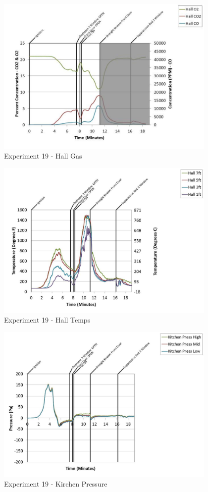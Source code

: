 \documentclass{article}
\begin{document}
\begin{appendices}
	\clearpage

	\begin{figure}[h!]
		\centering
		\includegraphics[height=3.05in]{0_Images/Results_Charts/Exp_19_Charts/HallGas.pdf}
		\caption{Experiment 19 - Hall Gas}
	\end{figure}
 

	\begin{figure}[h!]
		\centering
		\includegraphics[height=3.05in]{0_Images/Results_Charts/Exp_19_Charts/HallTemps.pdf}
		\caption{Experiment 19 - Hall Temps}
	\end{figure}
 
	\clearpage

	\begin{figure}[h!]
		\centering
		\includegraphics[height=3.05in]{0_Images/Results_Charts/Exp_19_Charts/KirchenPressure.pdf}
		\caption{Experiment 19 - Kirchen Pressure}
	\end{figure}
 


\end{appendices}
\end{document}
